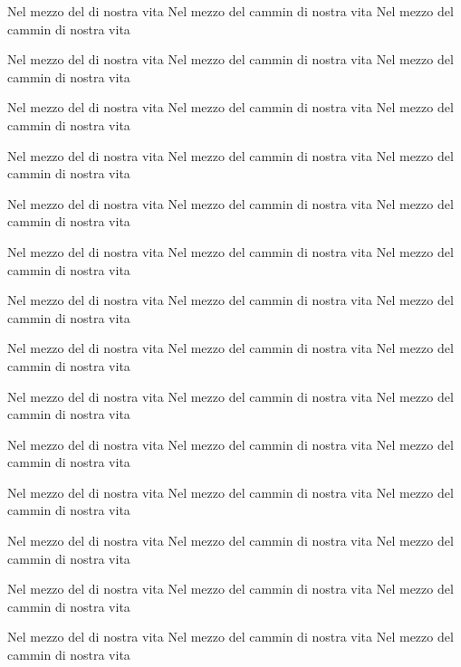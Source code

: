 \documentclass[11pt,a4paper,twoside]{book}
\begin{document}
\beginnumbering
\numberpstarttrue
{}
\pstart%
%
%
Nel mezzo del  di nostra vita Nel mezzo del cammin di nostra vita Nel mezzo del cammin di nostra vita
\pend

\pstart%
%
%
Nel mezzo del  di nostra vita Nel mezzo del cammin di nostra vita Nel mezzo del cammin di nostra vita
\pend

\pstart%
%
%
Nel mezzo del  di nostra vita Nel mezzo del cammin di nostra vita Nel mezzo del cammin di nostra vita
\pend

\pstart%
%
%
Nel mezzo del  di nostra vita Nel mezzo del cammin di nostra vita Nel mezzo del cammin di nostra vita
\pend

\pstart%
%
%
%
Nel mezzo del  di nostra vita Nel mezzo del cammin di nostra vita Nel mezzo del cammin di nostra vita
\pend

\pstart%
%
Nel mezzo del  di nostra vita Nel mezzo del cammin di nostra vita Nel mezzo del cammin di nostra vita
\pend

\pstart%
%
Nel mezzo del  di nostra vita Nel mezzo del cammin di nostra vita Nel mezzo del cammin di nostra vita
\pend

\pstart%
%
Nel mezzo del  di nostra vita Nel mezzo del cammin di nostra vita Nel mezzo del cammin di nostra vita
\pend

\pstart%
%
Nel mezzo del  di nostra vita Nel mezzo del cammin di nostra vita Nel mezzo del cammin di nostra vita
\pend

\pstart%
%
Nel mezzo del  di nostra vita Nel mezzo del cammin di nostra vita Nel mezzo del cammin di nostra vita
\pend

\pstart%
%
Nel mezzo del  di nostra vita Nel mezzo del cammin di nostra vita Nel mezzo del cammin di nostra vita
\pend

\pstart%
%
Nel mezzo del  di nostra vita Nel mezzo del cammin di nostra vita Nel mezzo del cammin di nostra vita
\pend

\pstart%
%
Nel mezzo del  di nostra vita Nel mezzo del cammin di nostra vita Nel mezzo del cammin di nostra vita
\pend

\pstart%
%
Nel mezzo del  di nostra vita Nel mezzo del cammin di nostra vita Nel mezzo del cammin di nostra vita
\pend

\numberpstartfalse
\endnumbering
\end{document}
